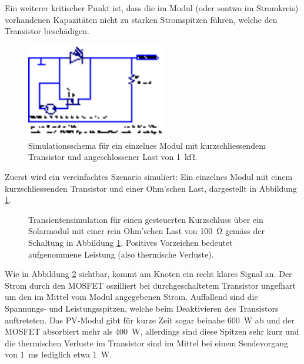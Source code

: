 Ein  weiterer  kritischer  Punkt  ist,  dass die  im  Modul  (oder  sontwo  im
Stromkreis) vorhandenen Kapazit\"aten nicht  zu starken Stromspitzen f\"uhren,
welche den Transistor besch\"adigen.

\begin{figure}
    \vspace*{-1em}
    \centering
    \includegraphics[width=60mm]{images/ltspice/jac/shortcircuit-transmitter.eps}
    \caption[-Schaltung Kurzschlussmethode, Sender, vereinfacht]{
        Simulationsschema  f\"ur  ein  einzelnes Modul  mit  kurzschliessendem
        Transistor und angeschlossener Last von \SI{1}{\kilo\ohm}.%
    }
    \label{fig:ltspice:shortCircuit:transmitter}
    \vspace*{-4em}
\end{figure}

Zuerst wird ein vereinfachtes Szenario simuliert: Ein einzelnes Modul mit einem
kurzschliessenden Transistor und einer Ohm'schen Last, dargestellt in Abbildung
\ref{fig:ltspice:shortCircuit:transmitter}.


\begin{figure}[h!tb]
    
    \caption[Simulationsergebnisse Kurzschlussmethode, Sender]{%
        Transientensimulation    f\"ur     einen    gesteuerten    Kurzschluss
        \"uber     ein     Solarmodul     mit     einer     rein     Ohm'schen
        Last      von      \SI{100}{\ohm}     gem\"ass      der      Schaltung
        in   Abbildung   \ref{fig:ltspice:shortCircuit:transmitter}. Positives
        Vorzeichen bedeutet aufgenommene Leistung (also thermische Verluste).%
    }
    \label{fig:simu:shortCircuit:transmitter}
\end{figure}


Wie  in Abbildung  \ref{fig:simu:shortCircuit:transmitter} sichtbar,  kommt am
Knoten  ein  recht klares Signal an. Der Strom  durch den MOSFET
oszilliert bei durchgeschaltetem  Transistor ungef\"hart um den  im Mittel vom
Modul angegebenen Strom. Auffallend sind  die Spannungs- und Leistungsspitzen,
welche beim Deaktivieren des  Transistors auftreteten. Das PV-Modul gibt f\"ur
kurze  Zeit  sogar  beinahe  \SI{600}{\watt}  ab  und  der  MOSFET  absorbiert
mehr  als \SI{400}{\watt},  allerdings sind  diese Spitzen  sehr kurz  und die
thermischen Verluste im  Transistor sind im Mittel bei  einem Sendevorgang von
\SI{1}{\milli\second} lediglich etwa \SI{1}{\watt}.


